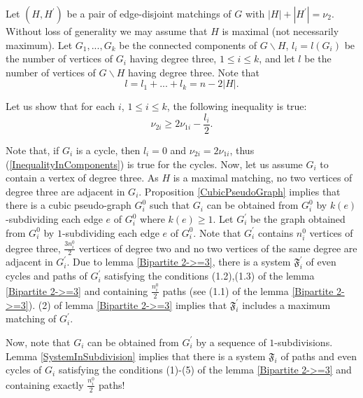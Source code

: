 \documentclass[fleqn,12pt,twoside]{article}
\newenvironment{proof}[1][Proof.]{\begin{trivlist}
\item[\hskip \labelsep {\bfseries #1}]}{\end{trivlist}}
\begin{document}
\begin{proof}
Let $(H,H^{\prime })$ be a pair of edge-disjoint matchings of
$G$ with $\left\vert H\right\vert +\left\vert H^{\prime }\right\vert
=\nu _{2}$. Without loss of generality we may assume that $H$ is
maximal (not necessarily maximum). Let $G_{1},...,G_{k}$ be the
connected components of $G\backslash H$, $l_i=l(G_{i})$ be the
number of vertices of $G_{i}$ having
degree three, $1\leq i\leq k$, and let $l$ be the number of vertices of $G\backslash H$ having degree three. Note that\begin{equation*}
l=l_{1}+...+l_{k}=n -2\left\vert H\right\vert \text{.}
\end{equation*}

Let us show that for each $i$, $1\leq i\leq k$, the following
inequality is
true:\begin{equation}
\nu _{2i}\geq 2\nu _{1i}-\frac{l_i}{2}.
\label{InequalityInComponents}
\end{equation}

Note that, if $G_{i}$ is a cycle, then $l_{i}=0$ and $\nu _{2i}=2\nu
_{1i}$, thus (\ref{InequalityInComponents}) is true for the cycles.
Now, let us assume $G_{i}$ to contain a vertex of degree three. As
$H$ is a maximal matching, no two vertices of degree three are
adjacent in $G_{i}$. Proposition
\ref{CubicPseudoGraph} implies that there is a cubic pseudo-graph $G_{i}^{0}$ such that $G_{i}$ can be obtained from $G_{i}^{0}$ by $k(e)$-subdividing each edge $e$ of $G_{i}^{0}$ where $k(e)\geq 1$. Let $G_{i}^{\prime }$ be the graph obtained from
$G_{i}^{0}$ by $1$-subdividing each edge $e$ of $G_{i}^{0}$. Note
that $G_{i}^{\prime }$
contains $n_{i}^{0}$ vertices of degree three, $\frac{3n_{i}^{0}}{2}$ vertices of degree two and no two vertices of
the same degree are adjacent in $G_{i}^{\prime }$. Due to lemma
\ref{Bipartite 2->=3}, there is a system $\mathfrak{F}_{i}^{\prime
}$ of even cycles and paths of $G_{i}^{\prime }$ satisfying the
conditions
(1.2),(1.3) of the lemma \ref{Bipartite 2->=3} and containing $\frac{n_{i}^{0}}{2}$ paths (see (1.1) of the lemma \ref {Bipartite 2->=3}). (2) of lemma \ref{Bipartite 2->=3} implies that $\mathfrak{F}_{i}^{\prime }$ includes a maximum matching of
$G_{i}^{\prime }$.

Now, note that $G_{i}$ can be obtained from $G_{i}^{\prime }$ by a
sequence of $1$-subdivisions. Lemma \ref{SystemInSubdivision}
implies that there is a system $\mathfrak{F}_{i}$ of paths and even
cycles of $G_{i}$ satisfying the conditions (1)-(5) of the lemma
\ref{Bipartite 2->=3} and containing exactly $\frac{n_{i}^{0}}{2}$
paths!


\end{proof}
\end{document}
